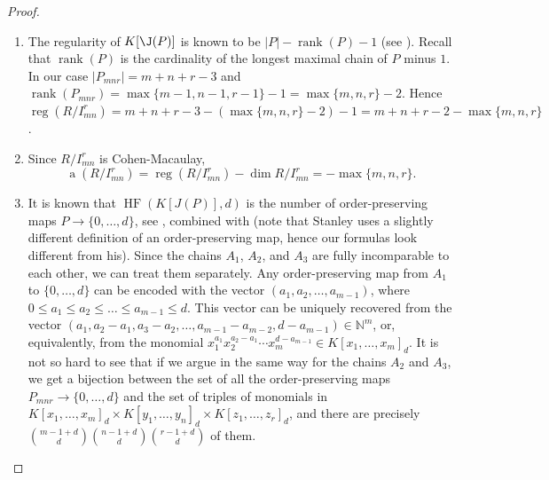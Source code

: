 \documentclass[12pt]{amsart}
\numberwithin{equation}{section}
\theoremstyle{definition}
\DeclareMathOperator{\HF}{HF}
\DeclareMathOperator{\rank}{rank}
\DeclareMathOperator{\reg}{reg}
\DeclareMathOperator{\ainv}{a}
\begin{document}
\begin{proof}
\begin{enumerate}
        \smallskip
        \item The regularity of $K[\J(P)]$ is known to be $|P|-\rank(P)-1$ (see \cite[Theorem~1.1]{EHM}). Recall that $\rank(P)$ is the cardinality of the longest maximal chain of $P$ minus $1$. In our case $|P_{mnr}|=m+n+r-3$ and $\rank(P_{mnr})=\max\{m-1,n-1,r-1\}-1=\max\{m,n,r\}-2$. Hence $\reg (R/I_{mn}^r)=m+n+r-3-(\max\{m, n,r\} -2)-1=m+n+r-2-\max\{m,n,r\}$. 
           \smallskip
        \item Since $R/I^r_{mn}$ is Cohen-Macaulay, \[\ainv(R/I_{mn}^r)=\reg(R/I_{mn}^r)-\dim R/I_{mn}^r=-\max\{m,n,r\}.\] 
           \smallskip
        \item It is known that $\HF(K[J(P)],d)$ is the number of order-preserving maps $P\to \{0,\ldots, d\}$, see \cite[Proposition 2.3]{HiHi}, combined with \cite[Theorem 3.15.8]{Stn} (note that Stanley uses a slightly different definition of an order-preserving map, hence our formulas look different from his). Since the chains $A_1$, $A_2$, and $A_3$ are fully incomparable to each other, we can treat them separately. Any order-preserving map from $A_1$ to $\{0,\ldots, d\}$ can be encoded with the vector 
        $(a_1,a_2,\ldots,a_{m-1})$, where $0\le a_1\le a_2\le\ldots\le a_{m-1}\le d$. This vector can be uniquely recovered from the vector $(a_1,a_2-a_1,a_3-a_2,\ldots,a_{m-1}-a_{m-2},d-a_{m-1})\in\mathbb{N}^m$, or, equivalently, from the monomial $x_1^{a_1}x_2^{a_2-a_1}\cdots x_m^{d-a_{m-1}}\in K[x_1,\ldots,x_m]_d$. It is not so hard to see that if we argue in the same way for the chains $A_2$ and $A_3$, we get a bijection between the set of all the order-preserving maps $P_{mnr}\to \{0,\ldots, d\}$ and the set of  triples of monomials in $K[x_1,\ldots,x_m]_d\times K[y_1,\ldots,y_n]_d \times K[z_1,\ldots,z_r]_d$, and there are precisely $\binom{m-1+d}{d}\binom{n-1+d}{d}\binom{r-1+d}{d}$ of them.
\end{enumerate}
\end{proof}
\end{document}
